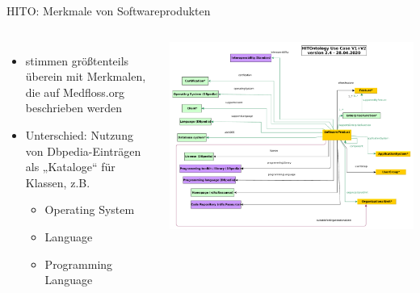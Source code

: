 \documentclass[aspectratio=1610,12pt]{beamer}
\begin{document}
\begin{frame}{HITO: Merkmale von Softwareprodukten}
\begin{columns}
  \begin{itemize}
    \item stimmen größtenteils überein mit Merkmalen, die auf Medfloss.org beschrieben werden
    \item Unterschied: Nutzung von Dbpedia-Einträgen als „Kataloge“ für Klassen, z.B.
    \begin{itemize}
      \item Operating System
      \item Language
      \item Programming Language
    \end{itemize}
  \end{itemize}
\includegraphics[width=\textwidth]{img/excerpt2.pdf}
\end{columns}
\end{frame}
\end{document}
